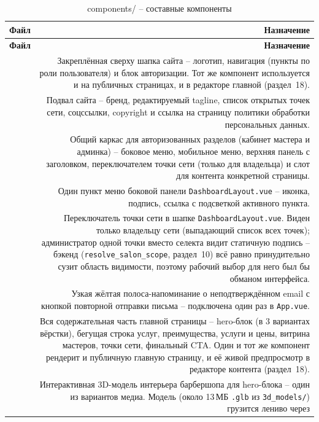 \begin{xltabular}{\textwidth}{M D}
\caption{components/ -- составные компоненты} \\
\hline
\textbf{Файл} & \textbf{Назначение} \\
\hline
\endfirsthead
\hline
\textbf{Файл} & \textbf{Назначение} \\
\hline
\endhead
\hline
\endfoot
{} & Закреплённая сверху шапка сайта -- логотип,
  навигация (пункты по роли пользователя) и блок авторизации. Тот же
  компонент используется и на публичных страницах, и в редакторе
  главной (раздел~18). \\
 & Подвал сайта -- бренд, редактируемый tagline,
  список открытых точек сети, соцссылки, copyright и ссылка на страницу
  политики обработки персональных данных. \\
 & Общий каркас для авторизованных разделов
  (кабинет мастера и админка) -- боковое меню, мобильное меню, верхняя
  панель с заголовком, переключателем точки сети (только для владельца)
  и слот для контента конкретной страницы. \\
 & Один пункт меню боковой панели
  \texttt{DashboardLayout.vue} -- иконка, подпись, ссылка с подсветкой
  активного пункта. \\
 & Переключатель точки сети в шапке
  \texttt{DashboardLayout.vue}. Виден только владельцу сети
  (выпадающий список всех точек); администратор одной точки вместо
  селекта видит статичную подпись -- бэкенд (\texttt{resolve_salon_scope},
  раздел~10) всё равно принудительно сузит область видимости, поэтому
  рабочий выбор для него был бы обманом интерфейса. \\
 & Узкая жёлтая полоса-напоминание о
  неподтверждённом email с кнопкой повторной отправки письма --
  подключена один раз в \texttt{App.vue}. \\
 & Вся содержательная часть главной страницы --
  hero-блок (в 3 вариантах вёрстки), бегущая строка услуг, преимущества,
  услуги и цены, витрина мастеров, точки сети, финальный CTA. Один и тот
  же компонент рендерит и публичную главную страницу, и её живой
  предпросмотр в редакторе контента (раздел~18). \\
 & Интерактивная 3D-модель интерьера барбершопа
  для hero-блока -- один из вариантов медиа. Модель (около 13\,МБ
  \texttt{.glb} из \texttt{3d_models/}) грузится лениво через

\end{xltabular}
